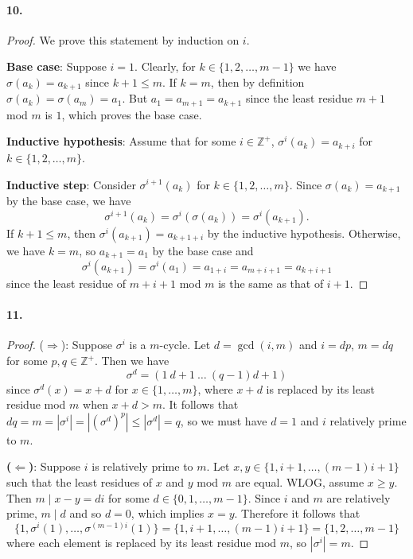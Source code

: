 \documentclass{article}
\begin{document}
\paragraph{10.}
\begin{proof}
  We prove this statement by induction on $i$.

  \textbf{Base case}: Suppose $i = 1$. Clearly, for $k \in
  \{1, 2, \ldots, m-1\}$ we have $\sigma(a_k) = a_{k+1}$ since $k + 1 \leq m$.
  If $k = m$, then by definition $\sigma(a_k) = \sigma(a_m) = a_1$. But $a_1 =
  a_{m+1} = a_{k+1}$ since the least residue $m+1$ mod $m$ is $1$, which
  proves the base case.

  \textbf{Inductive hypothesis}: Assume that for some $i \in \mathbb{Z}^+$,
  $\sigma^i(a_k) = a_{k+i}$ for $k \in \{1, 2, \ldots, m\}$.

  \textbf{Inductive step}: Consider $\sigma^{i+1}(a_k)$ for $k \in \{1, 2,
  \ldots, m\}$. Since $\sigma(a_k) = a_{k+1}$ by the base case, we have \[
    \sigma^{i+1}(a_k) = \sigma^i(\sigma(a_k)) = \sigma^i(a_{k+1}).
  \] If $k + 1 \leq m$, then $\sigma^i(a_{k+1}) = a_{k+1+i}$ by the inductive
  hypothesis. Otherwise, we have $k = m$, so $a_{k+1} = a_1$ by the base case
  and \[
    \sigma^i(a_{k+1}) = \sigma^i(a_1) = a_{1+i} = a_{m+i+1} = a_{k+i+1}
  \] since the least residue of $m+i+1$ mod $m$ is the same as that of $i+1$.
\end{proof}

\paragraph{11.}
\begin{proof}
  ($\Rightarrow$): Suppose $\sigma^i$ is a $m$-cycle. Let $d = \gcd(i, m)$ and
  $i = dp$, $m = dq$ for some $p, q \in \mathbb{Z}^+$. Then we have \[
    \sigma^d = (1\ d+1\ \ldots\ (q-1)d+1)
  \] since $\sigma^d(x) = x+d$ for $x \in \{1, \ldots, m\}$, where $x+d$ is
  replaced by its least residue mod $m$ when $x+d > m$. It follows that
  $dq = m = |\sigma^i| = |(\sigma^d)^p| \leq |\sigma^d| = q$, so we must have
  $d = 1$ and $i$ relatively prime to $m$.

  \textbf{($\Leftarrow$)}: Suppose $i$ is relatively prime to $m$. Let $x, y \in
  \{1, i+1, \ldots, (m-1)i+1\}$ such that the least residues of $x$ and $y$ mod
  $m$ are equal. WLOG, assume $x \geq y$. Then $m \mid x - y = di$ for some $d
  \in \{0, 1, \ldots, m-1\}$. Since $i$ and $m$ are relatively prime, $m \mid d$
  and so $d = 0$, which implies $x = y$. Therefore it follows that \[
    \{1, \sigma^i(1), \ldots, \sigma^{(m-1)i}(1)\}
    = \{1, i+1, \ldots, (m-1)i+1\}
    = \{1, 2, \ldots, m-1\}
  \] where each element is replaced by its least residue mod $m$, so $|\sigma^i|
  = m$.
\end{proof}
\end{document}
